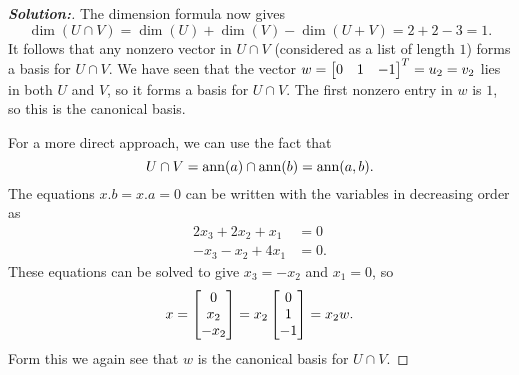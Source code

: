 \documentclass[a4paper]{amsart}
\theoremstyle{definition}
\newenvironment{solution}{\begin{proof}[\textbf{Solution:}] \vphantom{u}}{\end{proof}}
\begin{document}
\begin{solution}
 The dimension formula now gives
 \[ \dim(U\cap V) = \dim(U)+\dim(V)-\dim(U+V) = 2+2-3 = 1. \]
 It follows that any nonzero vector in $U\cap V$ (considered as a list
 of length $1$) forms a basis for $U\cap V$.  We have seen that the
 vector $w=\left[\begin{matrix} 0&1&-1\end{matrix}\right]^T=u_2=v_2$ lies in both $U$ and $V$, so it
 forms a basis for $U\cap V$.  The first nonzero entry in $w$ is $1$,
 so this is the canonical basis.

 For a more direct approach, we can use the fact that 
 \[ U\cap V = \operatorname{ann}(a)\cap\operatorname{ann}(b) = \operatorname{ann}(a,b). \]
 The equations $x.b=x.a=0$ can be written with the variables in
 decreasing order as
 \begin{align*}
  2x_3+2x_2+x_1 &= 0 \\
  -x_3-x_2+4x_1 &= 0.
 \end{align*}
 These equations can be solved to give $x_3=-x_2$ and $x_1=0$, so
 \[ x = \left[\begin{matrix} 0 \\ x_2 \\ -x_2 \end{matrix}\right] =
      x_2 \left[\begin{matrix} 0 \\ 1 \\ -1 \end{matrix}\right] = x_2w.
 \]
 Form this we again see that $w$ is the canonical basis for $U\cap V$.
\end{solution}
\end{document}
